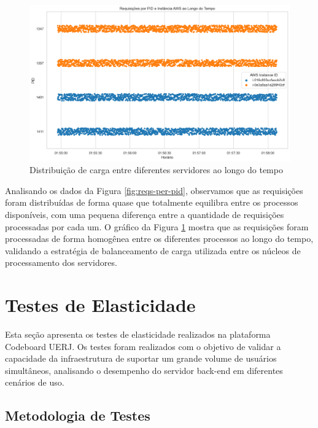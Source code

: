 \begin{figure}[H]
    \centering
    \includegraphics[width=1\textwidth]{assets/balance-test/reqs-per-pid-over-time.png}
    \caption{Distribuição de carga entre diferentes servidores ao longo do tempo}
    \label{fig:reqs-per-pid-over-time}
\end{figure}

Analisando os dados da Figura \ref{fig:reqs-per-pid}, observamos que as requisições foram distribuídas de forma quase que totalmente equilibra entre os processos disponíveis, com uma pequena diferença entre a quantidade de requisições processadas por cada um. O gráfico da Figura \ref{fig:reqs-per-pid-over-time} mostra que as requisições foram processadas de forma homogênea entre os diferentes processos ao longo do tempo, validando a estratégia de balanceamento de carga utilizada entre os núcleos de processamento dos servidores.



\section{Testes de Elasticidade}

Esta seção apresenta os testes de elasticidade realizados na plataforma Codeboard UERJ. Os testes foram realizados com o objetivo de validar a capacidade da infraestrutura de suportar um grande volume de usuários simultâneos, analisando o desempenho do servidor back-end em diferentes cenários de uso.


\subsection{Metodologia de Testes}


